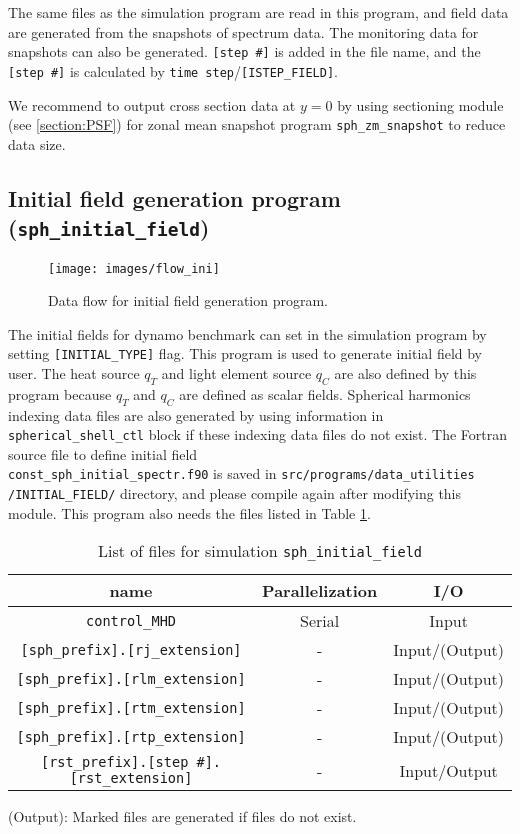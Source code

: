 The same files as the simulation program are read in this program, and field data are generated from the snapshots of spectrum data. The monitoring data for snapshots can also be generated. \verb|[step #]| is added in the file name, and the \verb|[step #]| is calculated by \verb|time step|/\verb|[ISTEP_FIELD]|.

We recommend to output cross section data at $y = 0$ by using sectioning module (see \ref{section:PSF}) for zonal mean snapshot program \verb|sph_zm_snapshot| to reduce data size.

\newpage
\subsection{Initial field generation program \\
({\tt sph\_initial\_field})}
\label{sec:sph_initial_field}
%
\begin{figure}[htbp]
\begin{center}
\texttt{[image: images/flow\_ini]}
\end{center}
\caption{Data flow for initial field generation program.}
\label{fig:flow_ini}
\end{figure}
%
 The initial fields for dynamo benchmark can set in the simulation program by setting \verb|[INITIAL_TYPE]| flag. This program is used to generate initial field by user.  The heat source $q_{T}$ and light element source $q_{C}$ are also defined by this program because $q_{T}$ and $q_{C}$ are defined as scalar fields. Spherical harmonics indexing data files are also generated by using information in \verb|spherical_shell_ctl| block if these indexing data files do not exist. The Fortran source file to define initial field \\
 \verb|const_sph_initial_spectr.f90| is saved in \verb|src/programs/data_utilities| \\
 \verb|/INITIAL_FIELD/| directory,  and please compile again after modifying this module. This program also needs the files listed in Table \ref{table:inital_fld}.
%
\begin{table}[htp]
\caption{List of files for simulation {\tt sph\_initial\_field} }
\begin{center} 
\begin{tabular}{|c|c|c|}
\hline
 name & Parallelization & I/O \\ \hline \hline
\verb|control_MHD| & Serial & Input \\ \hline
\verb|[sph_prefix].[rj_extension]|  & - & Input/(Output) \\
\verb|[sph_prefix].[rlm_extension]| & - & Input/(Output) \\
\verb|[sph_prefix].[rtm_extension]| & - & Input/(Output) \\
\verb|[sph_prefix].[rtp_extension]| & - & Input/(Output) \\ \hline
\verb|[rst_prefix].[step #].[rst_extension]| & - & Input/Output  \\ \hline
\end{tabular}
\end{center}
(Output): Marked files are generated if files do not exist.
\label{table:inital_fld}
\end{table}
